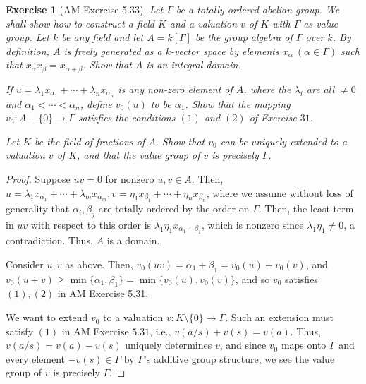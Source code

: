 \documentclass[12pt,letterpaper]{article}
\newtheorem{problem}{Exercise}[section]
\theoremstyle{definition}
\theoremstyle{remark}
\numberwithin{figure}{problem}
\numberwithin{equation}{section}
\begin{document}
\begin{problem}[AM Exercise 5.33]
  Let $\Gamma$ be a totally ordered abelian group. We shall show how to construct a field $K$ and a valuation $v$ of $K$ with $\Gamma$ as value group. Let $k$ be any field and let $A = k[\Gamma]$ be the group algebra of $\Gamma$ over $k$. By definition, $A$ is freely generated as a $k$-vector space by elements $x_\alpha~(\alpha \in \Gamma)$ such that $x_\alpha x_\beta = x_{\alpha+\beta}$. Show that $A$ is an integral domain.
  \par If $u = \lambda_1x_{\alpha_1} + \cdots + \lambda_nx_{\alpha_n}$ is any non-zero element of $A$, where the $\lambda_i$ are all $\ne 0$ and $\alpha_1 < \cdots < \alpha_n$, define $v_0(u)$ to be $\alpha_1$. Show that the mapping $v_0 : A - \{0\} \to \Gamma$ satisfies the conditions $(1)$ and $(2)$ of Exercise $31$.
  \par Let $K$ be the field of fractions of $A$. Show that $v_0$ can be uniquely extended to a valuation $v$ of $K$, and that the value group of $v$ is precisely $\Gamma$.
\end{problem}
\begin{proof}
  Suppose $uv = 0$ for nonzero $u,v \in A$. Then, $u = \lambda_1x_{\alpha_1} + \cdots + \lambda_mx_{\alpha_m}, v = \eta_1x_{\beta_1} + \cdots + \eta_nx_{\beta_n}$, where we assume without loss of generality that $\alpha_i,\beta_j$ are totally ordered by the order on $\Gamma$. Then, the least term in $uv$ with respect to this order is $\lambda_1\eta_1x_{\alpha_1+\beta_1}$, which is nonzero since $\lambda_1\eta_1 \ne 0$, a contradiction. Thus, $A$ is a domain.
  \par Consider $u,v$ as above. Then, $v_0(uv) = \alpha_1+\beta_1 = v_0(u)+v_0(v)$, and $v_0(u+v) \ge \min\{\alpha_1,\beta_1\} = \min\{v_0(u),v_0(v)\}$, and so $v_0$ satisfies $(1),(2)$ in AM Exercise 5.31.
  \par We want to extend $v_0$ to a valuation $v : K \setminus \{0\} \to \Gamma$. Such an extension must satisfy $(1)$ in AM Exercise $5.31$, i.e., $v(a/s) + v(s) = v(a)$. Thus, $v(a/s) = v(a) - v(s)$ uniquely determines $v$, and since $v_0$ maps onto $\Gamma$ and every element $-v(s) \in \Gamma$ by $\Gamma$'s additive group structure, we see the value group of $v$ is precisely $\Gamma$.
\end{proof}


\printbibliography
\end{document}
